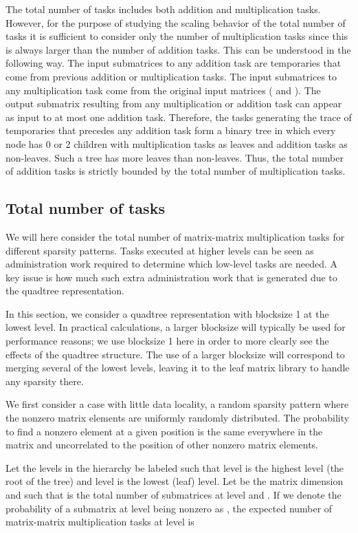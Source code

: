 \documentclass{elsarticle}
\begin{document}
The total number of tasks includes both addition and multiplication
tasks. However, for the purpose of studying the scaling behavior of
the total number of tasks it is sufficient to consider only the number
of multiplication tasks since this is always larger than the number of
addition tasks. This can be understood in the following way. The input
submatrices to any addition task are temporaries that come from
previous addition or multiplication tasks. The input submatrices to
any multiplication task come from the original input matrices ( and
). The output submatrix resulting from any multiplication or
addition task can appear as input to at most one addition task.
Therefore, the tasks generating the trace of temporaries that precedes
any addition task form a binary tree in which every node has 0 or 2
children with multiplication tasks as leaves and addition tasks as
non-leaves.  Such a tree has more leaves than non-leaves.  Thus, the
total number of addition tasks is strictly bounded by the total number
of multiplication tasks.

\subsection{Total number of tasks}
We will here consider the total number of matrix-matrix multiplication
tasks for different sparsity patterns. Tasks executed at higher levels
can be seen as administration work required to determine which
low-level tasks are needed. A key issue is how much such extra
administration work that is generated due to the quadtree
representation.


In this section, we consider a quadtree representation with blocksize 1
at the lowest level. In practical calculations, a larger blocksize will
typically be used for performance reasons; we use blocksize 1 here in
order to more clearly see the effects of the quadtree structure. The
use of a larger blocksize will correspond to merging several of the
lowest levels, leaving it to the leaf matrix library to handle any sparsity there.

We first consider a case with little data locality, a random sparsity
pattern where the nonzero matrix elements are uniformly randomly
distributed. The probability  to find a nonzero element at a given
position is the same everywhere in the matrix and uncorrelated to the
position of other nonzero matrix elements.


Let the levels in the hierarchy be labeled such that level  is
the highest level (the root of the tree) and level  is the
lowest (leaf) level.  Let  be the matrix dimension and 
such that  is the total number of submatrices at level  and
.  If we denote the probability of a submatrix at level 
being nonzero as , the expected number of matrix-matrix
multiplication tasks at level  is
\end{document}

